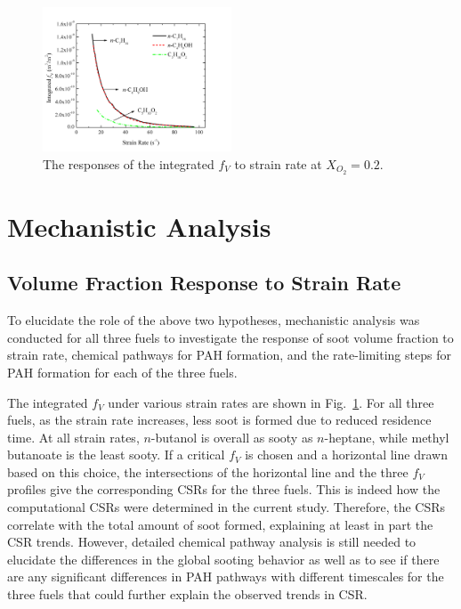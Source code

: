\documentclass[review,3p,times]{elsarticleUS}
\begin{document}
\begin{figure}[t]
  \centering
  \scriptsize
  \vspace{-0.1in}
  \includegraphics[trim=4mm 8mm 30mm 20mm, clip=true, width=0.5\textwidth]{SV-SR.png}
  \normalsize
  \vspace{-0.1in}
  \caption{The responses of the integrated $f_V$ to strain rate at $X_{O_2}=0.2$.}
  \label{fig:fv}
\end{figure}


\section{Mechanistic Analysis}

\subsection{Volume Fraction Response to Strain Rate}

To elucidate the role of the above two hypotheses, mechanistic analysis was conducted for all three fuels to investigate the response of soot volume fraction to strain rate, chemical pathways for PAH formation, and the rate-limiting steps for PAH formation for each of the three fuels.

The integrated $f_V$ under various strain rates are shown in Fig.~\ref{fig:fv}.  For all three fuels, as the strain rate increases, less soot is formed due to reduced residence time.  At all strain rates, $n$-butanol is overall as sooty as $n$-heptane, while methyl butanoate is the least sooty.  If a critical $f_V$ is chosen and a horizontal line drawn based on this choice, the intersections of the horizontal line and the three $f_V$ profiles give the corresponding CSRs for the three fuels.  This is indeed how the computational CSRs were determined in the current study.  Therefore, the CSRs correlate with the total amount of soot formed, explaining at least in part the CSR trends. However, detailed chemical pathway analysis is still needed to elucidate the differences in the global sooting behavior as well as to see if there are any significant differences in PAH pathways with different timescales for the three fuels that could further explain the observed trends in CSR.
\end{document}
